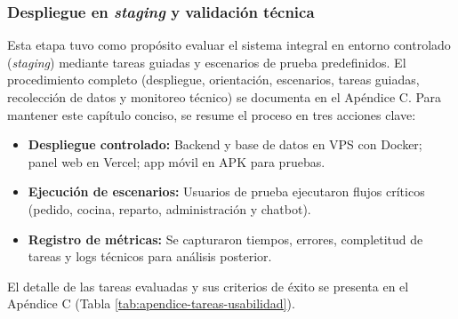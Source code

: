   \subsubsection{Despliegue en \textit{staging} y validación técnica}
  Esta etapa tuvo como propósito evaluar el sistema integral en entorno controlado (\textit{staging}) mediante tareas guiadas y escenarios de prueba predefinidos. El procedimiento completo (despliegue, orientación, escenarios, tareas guiadas, recolección de datos y monitoreo técnico) se documenta en el Apéndice C. Para mantener este capítulo conciso, se resume el proceso en tres acciones clave:
  \begin{itemize}
    \item \textbf{Despliegue controlado:} Backend y base de datos en VPS con Docker; panel web en Vercel; app móvil en APK para pruebas.
    \item \textbf{Ejecución de escenarios:} Usuarios de prueba ejecutaron flujos críticos (pedido, cocina, reparto, administración y chatbot).
    \item \textbf{Registro de métricas:} Se capturaron tiempos, errores, completitud de tareas y logs técnicos para análisis posterior.
  \end{itemize}
  El detalle de las tareas evaluadas y sus criterios de éxito se presenta en el Apéndice C (Tabla \ref{tab:apendice-tareas-usabilidad}).

